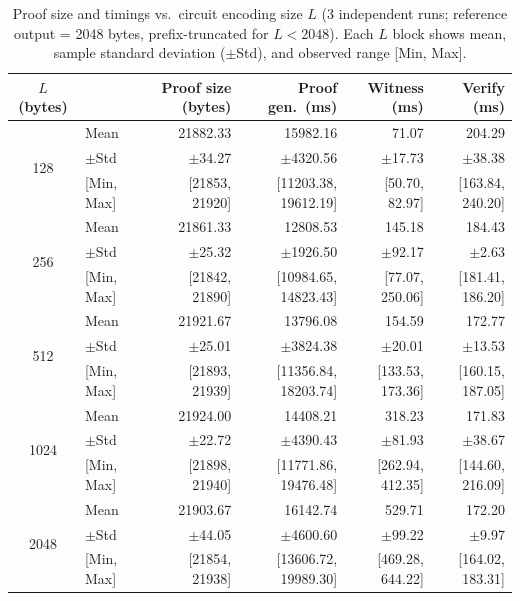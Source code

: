 \documentclass[10pt,conference,a4paper]{IEEEtran}
\begin{document}
\begin{table}[htbp]
\centering
\caption{Proof size and timings vs.\ circuit encoding size $L$ (3 independent runs; reference output = 2048 bytes, prefix-truncated for $L < 2048$). Each $L$ block shows mean, sample standard deviation ($\pm$Std), and observed range [Min, Max].}
\label{tab:results}
\footnotesize
\begin{tabular}{c l r r r r}
\hline
\hline
$L$ (bytes) & & Proof size (bytes) & Proof gen.\ (ms) & Witness (ms) & Verify (ms) \\
\hline
\multirow{3}{*}{128}
  & Mean      & 21882.33 & 15982.16 &  71.07 & 204.29 \\
  & $\pm$Std  & $\pm$34.27 & $\pm$4320.56 & $\pm$17.73 & $\pm$38.38 \\
  & {[Min, Max]} & {[21853, 21920]} & {[11203.38, 19612.19]} & {[50.70, 82.97]} & {[163.84, 240.20]} \\
\hline
\multirow{3}{*}{256}
  & Mean      & 21861.33 & 12808.53 & 145.18 & 184.43 \\
  & $\pm$Std  & $\pm$25.32 & $\pm$1926.50 & $\pm$92.17 & $\pm$2.63 \\
  & {[Min, Max]} & {[21842, 21890]} & {[10984.65, 14823.43]} & {[77.07, 250.06]} & {[181.41, 186.20]} \\
\hline
\multirow{3}{*}{512}
  & Mean      & 21921.67 & 13796.08 & 154.59 & 172.77 \\
  & $\pm$Std  & $\pm$25.01 & $\pm$3824.38 & $\pm$20.01 & $\pm$13.53 \\
  & {[Min, Max]} & {[21893, 21939]} & {[11356.84, 18203.74]} & {[133.53, 173.36]} & {[160.15, 187.05]} \\
\hline
\multirow{3}{*}{1024}
  & Mean      & 21924.00 & 14408.21 & 318.23 & 171.83 \\
  & $\pm$Std  & $\pm$22.72 & $\pm$4390.43 & $\pm$81.93 & $\pm$38.67 \\
  & {[Min, Max]} & {[21898, 21940]} & {[11771.86, 19476.48]} & {[262.94, 412.35]} & {[144.60, 216.09]} \\
\hline
\multirow{3}{*}{2048}
  & Mean      & 21903.67 & 16142.74 & 529.71 & 172.20 \\
  & $\pm$Std  & $\pm$44.05 & $\pm$4600.60 & $\pm$99.22 & $\pm$9.97 \\
  & {[Min, Max]} & {[21854, 21938]} & {[13606.72, 19989.30]} & {[469.28, 644.22]} & {[164.02, 183.31]} \\
\hline
\hline
\end{tabular}
\end{table}
\end{document}
